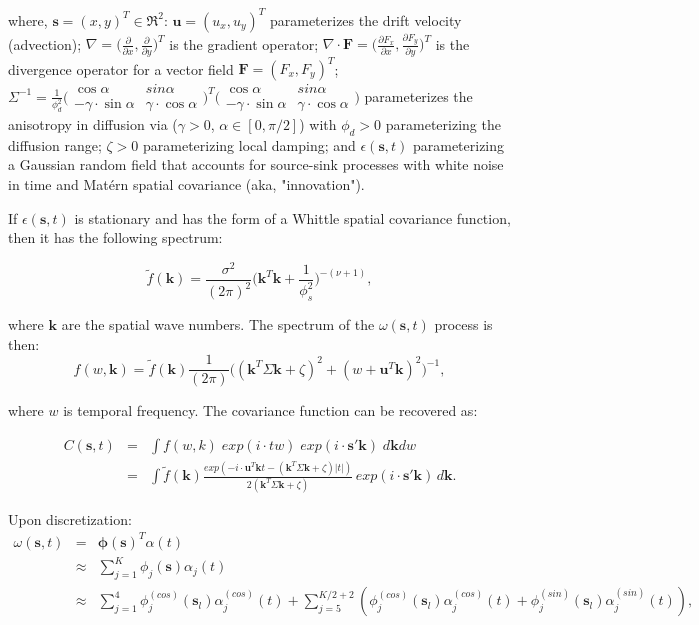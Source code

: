 \documentclass[letterpaper,portrait,11pt]{scrartcl}
\numberwithin{equation}{section}    %
\numberwithin{figure}{section}    %
\numberwithin{table}{section}       %
\begin{document}
\begin{appendices}
where, $\bm{s}=(x,y)^T \in \Re^2$: $\bm{u}=(u_x, u_y)^T$ parameterizes the drift velocity (advection); $\nabla = \Big( \frac{\partial}{\partial x}, \frac{\partial}{\partial y} \Big)^T$  is the gradient operator;  $\nabla \cdotp \bm{F} = \Big( \frac{\partial F_x}{\partial x}, \frac{\partial F_y}{\partial y} \Big)^T$ is the divergence operator for a vector field $\bm{F}=(F_x, F_y)^T$; $\Sigma^{-1} = \frac{1}{\phi^{2}_{d} }
\Big(
\begin{array}{cc}
\cos \alpha & sin \alpha \\
- \gamma \cdot \sin \alpha & \gamma \cdot \cos \alpha
\end{array}
\Big)^T
\Big(
\begin{array}{cc}
\cos \alpha & sin \alpha \\
- \gamma \cdot \sin \alpha & \gamma \cdot \cos \alpha
\end{array}
\Big) $ parameterizes the anisotropy in diffusion via ($\gamma > 0$, $\alpha \in [0,\pi/2]$) with $\phi_d > 0$  parameterizing the diffusion range; $\zeta > 0$ parameterizing local damping; and $\epsilon(\bm{s},t)$ parameterizing a Gaussian random field that accounts for source-sink processes with white noise in time and Mat\'{e}rn spatial covariance (aka, "innovation").

If $\epsilon(\bm{s},t)$ is stationary and has the form of a Whittle spatial covariance function, then it has the following spectrum:

\[
\tilde{f}(\bm{k}) = \frac {\sigma^2} {(2 \pi)^2}
\Bigg(
\bm{k}^T\bm{k} + \frac{1}{\phi_s^2}
\Bigg)^{-(\nu+1)},
\]

where $\bm{k}$ are the spatial wave numbers. The spectrum of  the $\omega(\bm{s},t)$ process is then:
\[
f(w,\bm{k}) = \tilde{f}(\bm{k}) \frac {1} {(2 \pi)}
\Big(
(\bm{k}^T \Sigma \bm{k} + \zeta)^2 + (w + \bm{u}^T \bm{k} )^2
\Big)^{-1} ,
\]

where $w$ is temporal frequency. The covariance function can be recovered as:

\begin{eqnarray}
  C(\bm{s},t) &=& \int f(w,k) \; exp(i \cdot tw ) \; exp(i \cdot \bm{s}'\bm{k} ) \; d\bm{k} dw \\
  &=& \int \tilde{f}(\bm{k}) \frac{exp(-i \cdot \bm{u}^T \bm{k} t - (\bm{k}^T \Sigma \bm{k} + \zeta) |t| )} {2(\bm{k}^T \Sigma \bm{k} + \zeta) } \, exp( i \cdot \bm{s}' \bm{k} ) \, d\bm{k} .
\end{eqnarray}


Upon discretization:
  \begin{eqnarray*}
    \omega(\bm{s},t)  &=& \bm{\phi}(\bm{s})^T \alpha(t) \\
    &\approx& \sum_{j=1}^{K} \phi_j(\bm{s}) \alpha_j(t)   \\
    &\approx& \sum_{j=1}^4 \phi_j^{(cos)} (\bm{s}_l) \alpha_j^{(cos)}(t)
    + \sum_{j=5}^{K/2+2} (  \phi_j^{(cos)} (\bm{s}_l )\alpha_j^{(cos)}(t) +   \phi_j^{(sin)} (\bm{s}_l ) \alpha_j^{(sin)}(t) ) ,
  \end{eqnarray*}


\end{appendices}
\end{document}
